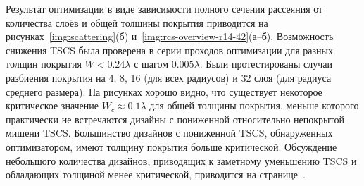 Результат оптимизации в виде зависимости полного сечения рассеяния от
количества слоёв и общей толщины покрытия приводится на
рисунках~\ref{img:scattering}(б)
и~\ref{img:rcs-overview-r14-42}(а--б). Возможность снижения TSCS была
проверена в серии проходов оптимизации для разных толщин
покрытия ${W < 0.24\lambda}$ с шагом $0.005\lambda$. Были
протестированы случаи разбиения покрытия на 4, 8, 16 (для всех
радиусов) и 32 слоя (для радиуса среднего размера). На рисунках хорошо
видно, что существует некоторое критическое значение
${W_c \approx 0.1\lambda}$ для общей толщины покрытия, меньше которого
практически не встречаются дизайны с пониженной относительно
непокрытой мишени TSCS. Большинство дизайнов с пониженной TSCS, обнаруженных
оптимизатором, имеют толщину покрытия больше критической. Обсуждение
небольшого количества дизайнов, приводящих к заметному уменьшению TSCS
и обладающих толщиной менее критической, приводится на
странице~\pageref{ref:thin-designs}\label{backref:thin-designs}.


